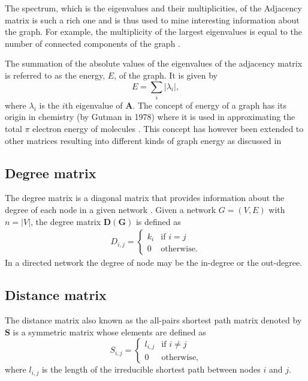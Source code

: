\documentclass[10pt,a4paper]{article}
\theoremstyle{plain}
\theoremstyle{definition}
\begin{document}
The spectrum, which is the eigenvalues and their multiplicities, of the Adjacency matrix is such a rich one and is thus used to mine interesting information about the graph. For example, the multiplicity of the largest eigenvalues is equal to the number of connected components of the graph \citep{cvetkovic2004spectral}. 

The summation of the absolute values of the eigenvalues of the adjacency matrix is referred to as the energy, $E$, of the graph. It is given by
\begin{equation}
E = \sum_{i} |\lambda_i|,
\end{equation}
where $\lambda_i$ is the $i$th eigenvalue of $\mathbf{A}$. The concept of energy of a graph has its origin in chemistry (by Gutman in 1978) where it is used in approximating the total $\pi$ electron energy of molecules \citep{gutman2001energy}. This concept has however been extended to other matrices resulting into different kinds of graph energy as discussed in \citep{ramane2008bounds,gutman2009incidence,gutman2006laplacian}


\subsection{Degree matrix}
	The degree matrix is a diagonal matrix that provides information about the degree of each node in a given network \citep{newman2010networks}. Given a network $G=(V,E)$ with $n=|V|$, the degree matrix $\mathbf{D(G)}$ is defined as
	\begin{eqnarray}
	D_{i,j} =  \begin{cases} k_i &\mbox{if } i = j \\
	0 & \text{otherwise}.
	\end{cases}
	\end{eqnarray}
	In a directed network the degree of node may be the in-degree or the out-degree.


\subsection{Distance matrix}
The distance matrix also known as the all-pairs shortest path matrix denoted by $\mathbf{S}$ is a symmetric matrix whose elements are defined as 
\begin{equation}
	S_{i,j} =  \begin{cases} l_{i,j} &\mbox{if } i \neq j \\
0 & \text{otherwise},
\end{cases}
\end{equation}
where $l_{i,j}$ is the length of the irreducible shortest path between nodes $i$ and $j$.
\end{document}
